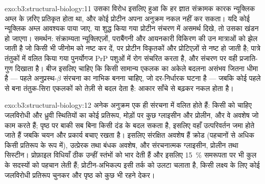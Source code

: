 \begin{solution}{exo:b3:structural-biology:11}
उसका विरोध इसलिए हुआ कि हर ज्ञात संक्रामक कारक न्यूक्लिक अम्ल के
ज़रिए प्रतिकृत होता था, और कोई प्रोटीन अपना अनुक्रम नकल नहीं कर सकता।
यदि कोई न्यूक्लिक अम्ल आवश्यक पाया जाए, या शुद्ध किया गया प्रोटीन
संचरण में असमर्थ दिखे, तो उसका खंडन हो जाएगा। समर्थन: संक्राम्यता
न्यूक्लिएज़ों, पराबैंगनी और आयनकारी विकिरण की उन मात्राओं को झेल जाती
है जो किसी भी जीनोम को नष्ट कर दें, पर प्रोटीन विकृतकों और प्रोटिएज़ों
से नष्ट हो जाती है; पात्रे तंतुकों में वलित किया गया पुनर्योगज
PrP पशुओं में रोग संचरित करता है, और संचरण पर वही प्रजाति-गुण दिखाता
है। बीज इसलिए चाहिए कि किसी सामान्य एकलक का अकेले बदलना असंभव जितना
धीमा है --- पहले अनुप्रस्थ-$\beta$ संरचना का नाभिक बनना चाहिए, जो
दर-निर्धारक घटना है --- जबकि कोई पहले से बना तंतुक-सिरा एकलकों को तेज़ी
से बदल देता है: आकार साँचे से बढ़कर नकल होता है।
\end{solution}

\begin{solution}{exo:b3:structural-biology:12}
अनेक अनुक्रम एक ही संरचना में वलित होते हैं: किसी  को चाहिए
जलविरोधी और ध्रुवी स्थितियों का कोई प्रतिरूप, मोड़ों पर कुछ ग्लाइसीन
और प्रोलीन, और वे अवशेष जो काम करते हैं; पृष्ठ पर बाकी सब बिना किसी
दंड के बदल सकता है, इसलिए वहाँ उत्परिवर्तन जमा होते जाते हैं जबकि चयन
 और प्रकार्य बचाए रखता है। इसलिए संरक्षित अवशेष हैं क्रोड (पहचानों
से अधिक किसी प्रतिरूप के रूप में), उत्प्रेरक तथा बंधक अवशेष, और
संरचनात्मक ग्लाइसीन, प्रोलीन तथा सिस्टीन। प्रोफ़ाइल विधियाँ ठीक उन्हीं
स्तंभों को भार देती हैं और इसलिए \qty{15}{\%} समरूपता पर भी कुल के
सदस्यों को पहचान लेती हैं; प्रोटीन-अभिकल्प इसी तर्क को उलटा चलाता है,
किसी लक्ष्य  के लिए कोई जलविरोधी प्रतिरूप चुनकर और पृष्ठ को कुछ भी
रहने देकर।
\end{solution}

